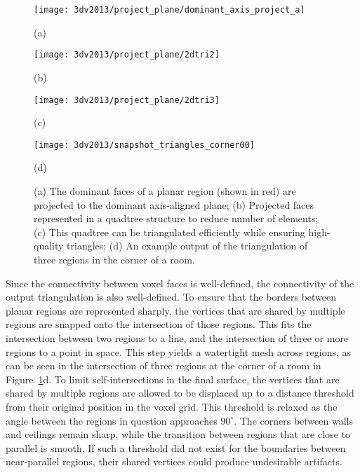 \documentclass[12pt,onecolumn,oneside]{book}
\begin{document}
\begin{figure}[t]

	\begin{minipage}[b]{0.48\linewidth}
		\centerline{\texttt{[image: 3dv2013/project\_plane/dominant\_axis\_project\_a]}}
		\centerline{(a)}\medskip
	\end{minipage}
	\hfill
	\begin{minipage}[b]{0.48\linewidth}
		\centerline{\texttt{[image: 3dv2013/project\_plane/2dtri2]}}
		\centerline{(b)}\medskip
	\end{minipage}
	
	\begin{minipage}[b]{0.48\linewidth}
		\centerline{\texttt{[image: 3dv2013/project\_plane/2dtri3]}}
		\centerline{(c)}\medskip
	\end{minipage}
	\hfill
	\begin{minipage}[b]{0.48\linewidth}
		\centerline{\texttt{[image: 3dv2013/snapshot\_triangles\_corner00]}}
		\centerline{(d)}\medskip
	\end{minipage}

	\caption[Triangulation of planar regions in voxel carving.]{(a) The dominant faces of a planar region (shown in red) are projected to the dominant axis-aligned plane; (b) Projected faces represented in a quadtree structure to reduce number of elements; (c) This quadtree can be triangulated efficiently while ensuring high-quality triangles; (d) An example output of the triangulation of three regions in the corner of a room.}
	\label{fig:triangulation}

\end{figure}

Since the connectivity between voxel faces is well-defined, the connectivity of the output triangulation is also well-defined.  To ensure that the borders between planar regions are represented sharply, the vertices that are shared by multiple regions are snapped onto the intersection of those regions.  This fits the intersection between two regions to a line, and the intersection of three or more regions to a point in space.  This step yields a watertight mesh across regions, as can be seen in the intersection of three regions at the corner of a room in Figure~\ref{fig:triangulation}d.  To limit self-intersections in the final surface, the vertices that are shared by multiple regions are allowed to be displaced up to a distance threshold from their original position in the voxel grid.  This threshold is relaxed as the angle between the regions in question approaches $90^{\circ}$.  The corners between walls and ceilings remain sharp, while the transition between regions that are close to parallel is smooth.  If such a threshold did not exist for the boundaries between near-parallel regions, their shared vertices could produce undesirable artifacts.
\end{document}
